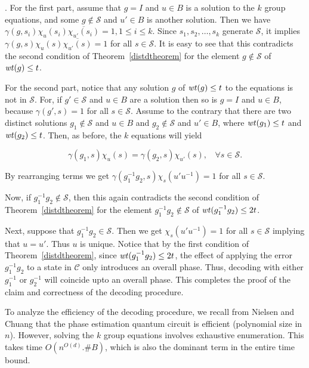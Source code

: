 \documentclass{Rinton-P9x6}
\newcommand{\cproof}{\noindent{\it Proof of Claim}}
\newenvironment{claimproof}{\cproof. }{\hspace*{\fill}\vspace{5mm}}
\newcommand{\wt}{{\it wt}}
\newcommand{\C}{{\ensuremath{\mathcal{C}}}}
\renewcommand{\S}{{\ensuremath{\mathcal{S}}}}
\begin{document}
\begin{claimproof}
  For the first part, assume that $g=I$ and $u\in B$ is a solution to
  the $k$ group equations, and some $g\not\in\S$ and $u'\in B$ is
  another solution. Then we have
  $\gamma(g,s_i)\chi_u(s_i)\overline{\chi_{u'}(s_i)}=1, 1\leq i\leq k$.
  Since $s_1,s_2,\ldots,s_k$ generate $\S$, it implies
  $\gamma(g,s)\chi_u(s)\overline{\chi_{u'}(s)}=1$ for all $s\in\S$. It
  is easy to see that this contradicts the second condition of
  Theorem~\ref{distdtheorem} for the element $g\not\in\S$ of
  $\wt(g)\leq t$.

For the second part, notice that any solution $g$ of $\wt(g)\leq t$ to
the equations is not in $\S$. For, if $g'\in\S$ and $u\in B$ are a
solution then so is $g=I$ and $u\in B$, because $\gamma(g',s)=1$ for
all $s\in\S$. Assume to the contrary that there are two distinct
solutions $g_1\not\in\S$ and $u\in B$ and $g_2\not\in\S$ and $u'\in
B$, where $\wt(g_1)\leq t$ and $\wt(g_2)\leq t$. Then, as before, the
$k$ equations will yield

\[
\gamma(g_1,s)\chi_u(s)=\gamma(g_2,s)\chi_{u'}(s), ~~~~\forall s\in\S.
\]

By rearranging terms we get $\gamma(g_1^{-1}g_2,s)\chi_s(u'u^{-1})=1$
for all $s\in\S$. 

Now, if $g_1^{-1}g_2\not\in\S$, then this again contradicts the second
condition of Theorem~\ref{distdtheorem} for the element
$g_1^{-1}g_2\not\in\S$ of $\wt(g_1^{-1}g_2)\leq 2t$.

Next, suppose that $g_1^{-1}g_2\in\S$. Then we get $\chi_s(u'u^{-1})=1$
for all $s\in\S$ implying that $u=u'$. Thus $u$ is unique. Notice that
by the first condition of Theorem~\ref{distdtheorem}, since
$\wt(g_1^{-1}g_2)\leq 2t$, the effect of applying the error
$g_1^{-1}g_2$ to a state in $\C$ only introduces an overall phase. Thus,
decoding with either $g_1^{-1}$ or $g_2^{-1}$ will coincide upto an
overall phase. This completes the proof of the claim and correctness
of the decoding procedure. 
\end{claimproof}

To analyze the efficiency of the decoding procedure, we recall from
Nielsen and Chuang\cite{NC99} that the phase estimation quantum
circuit is efficient (polynomial size in $n$). However, solving the
$k$ group equations involves exhaustive enumeration. This takes time
$O(n^{O(d)}.  \# B)$, which is also the dominant term in the entire
time bound.

%

\end{document}
